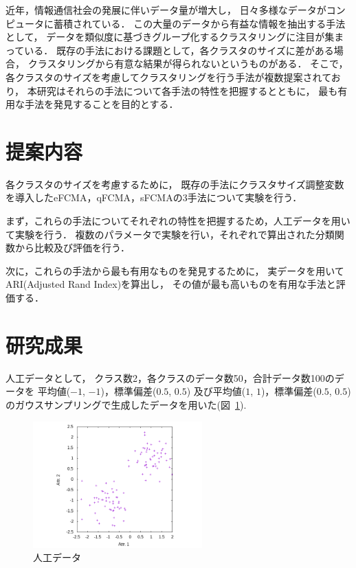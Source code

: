 \documentclass[twocolumn, a4paper]{icethesisabst}
\begin{document}
近年，情報通信社会の発展に伴いデータ量が増大し，
日々多様なデータがコンピュータに蓄積されている．
この大量のデータから有益な情報を抽出する手法として，
データを類似度に基づきグループ化するクラスタリングに注目が集まっている．
既存の手法における課題として，各クラスタのサイズに差がある場合，
クラスタリングから有意な結果が得られないというものがある．
そこで，各クラスタのサイズを考慮してクラスタリングを行う手法が複数提案されており，
本研究はそれらの手法について各手法の特性を把握するとともに，
最も有用な手法を発見することを目的とする．


\section{提案内容}

各クラスタのサイズを考慮するために，
既存の手法にクラスタサイズ調整変数を導入したeFCMA，qFCMA，sFCMAの3手法について実験を行う．

まず，これらの手法についてそれぞれの特性を把握するため，人工データを用いて実験を行う．
複数のパラメータで実験を行い，それぞれで算出された分類関数から比較及び評価を行う．

次に，これらの手法から最も有用なものを発見するために，
実データを用いてARI(Adjusted Rand Index)を算出し，
その値が最も高いものを有用な手法と評価する．

\section{研究成果}

人工データとして，
クラス数2，各クラスのデータ数50，合計データ数100のデータを
平均値($-1$, $-1$)，標準偏差($0.5$, $0.5$)
及び平均値($1$, $1$)，標準偏差($0.5$, $0.5$)
のガウスサンプリングで生成したデータを用いた(図~\ref{fig:a_data}).

\begin{figure}[htbp]
\centering
\includegraphics[width=6.5cm]{2d-dat.png}
\caption{人工データ}
\label{fig:a_data}
\end{figure}
\end{document}
